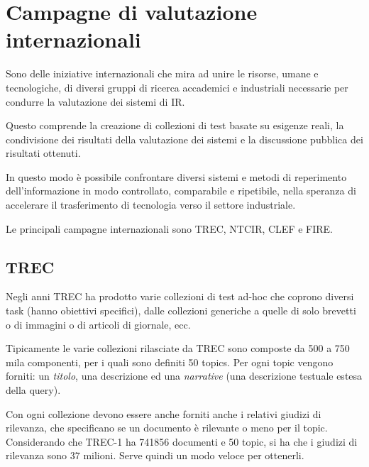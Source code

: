 

\section{Campagne di valutazione internazionali}

Sono delle iniziative internazionali che mira ad unire le risorse, umane e tecnologiche, di diversi gruppi di ricerca accademici e industriali necessarie per condurre la valutazione dei sistemi di IR.

Questo comprende la creazione di collezioni di test basate su esigenze reali, la condivisione dei risultati della valutazione dei sistemi e la discussione pubblica dei risultati ottenuti.

In questo modo è possibile confrontare diversi sistemi e metodi di reperimento dell'informazione in modo controllato, comparabile e ripetibile, nella speranza di accelerare il trasferimento di tecnologia verso il settore industriale.

Le principali campagne internazionali sono TREC, NTCIR, CLEF e FIRE.

\subsection{TREC}

Negli anni TREC ha prodotto varie collezioni di test ad-hoc che coprono diversi task (hanno obiettivi specifici), dalle collezioni generiche a quelle di solo brevetti o di immagini o di articoli di giornale, ecc.

Tipicamente le varie collezioni rilasciate da TREC sono composte da 500 a 750 mila componenti, per i quali sono definiti 50 topics. Per ogni topic vengono forniti: un \textit{titolo}, una descrizione ed una \textit{narrative} (una descrizione testuale estesa della query).

Con ogni collezione devono essere anche forniti anche i relativi giudizi di rilevanza, che specificano se un documento è rilevante o meno per il topic.
Considerando che TREC-1 ha 741856 documenti e 50 topic, si ha che i giudizi di rilevanza sono 37 milioni. Serve quindi un modo veloce per ottenerli.

